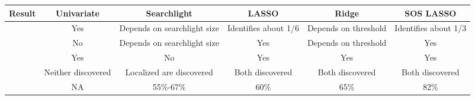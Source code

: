 \begin{tabular}{L{.25\textwidth} c c c c c}
\toprule
Result         & Univariate          & Searchlight                 & LASSO                & Ridge                & SOS LASSO  \\
\midrule
{} &  Yes                & Depends on searchlight size & Identifies about 1/6 & Depends on threshold & Identifies about 1/3 \\
 &  No                 & Depends on searchlight size & Yes                  & Depends on threshold & Yes \\
 &  Yes                & No                          & Yes                  & Yes                  & Yes \\
 &  Neither discovered & Localized are discovered    & Both discovered      & Both discovered      & Both discovered  \\
 &  NA                 & 55\%-67\%                   & 60\%                 & 65\%                 & 82\%  \\
\bottomrule
\end{tabular}





